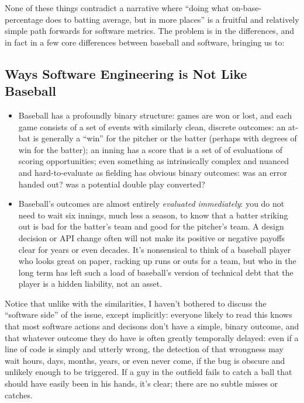 \documentclass[sigplan,screen]{acmart}
\begin{document}
         
 None of these things contradict a narrative where ``doing what on-base-percentage
 does to batting average, but in more places'' is a fruitful and
 relatively simple path forwards for software metrics.  The problem is
 in the differences, and in fact in a few core differences between
 baseball and software, bringing us to:

 \subsection{Ways Software Engineering is Not Like Baseball}

 \begin{itemize}
   \item Baseball has a profoundly binary structure:  games are won or
     lost, and each game consists of a set of events with similarly
     clean, discrete outcomes:  an at-bat is generally a ``win''
     for the pitcher or
     the batter
     (perhaps with degrees of win for the batter);
     an inning has a score that is a set of of evaluations
    of scoring opportunities; even something as intrinsically complex
    and nuanced and hard-to-evaluate as fielding has obvious binary
    outcomes: was an error handed out?  was a potential double play
    converted? 
    \item Baseball's outcomes are almost entirely \emph{evaluated
        immediately}:  you do not need to wait six innings, much less
      a season, to know that a batter striking out is bad for the
      batter's team and good for the pitcher's team.  A design
      decision or API change often will not make its positive or
      negative payoffs clear for years or even decades.
      It's nonsensical to think of a baseball player who looks great
      on paper, racking up runs or outs for a team, but who in the
      long term has left such a load of baseball's version of
      technical debt that the player is a hidden liability, not an
      asset.
    \end{itemize}

 Notice that unlike with the similarities, I haven't bothered to
 discuss the ``software side'' of the issue, except implicitly:
 everyone likely to read this knows that most software actions and
 decisons don't have a simple, binary outcome, and that whatever
 outcome they do have is often greatly temporally delayed:  even if a
 line of code is simply and utterly wrong, the detection of that
 wrongness may wait hours, days, months, years, or even never come, if
 the bug is obscure and unlikely enough to be triggered.  If a guy in the outfield
 fails to catch a ball that should have easily been in his hands, it's
 clear; there are no subtle misses or catches.
\end{document}
